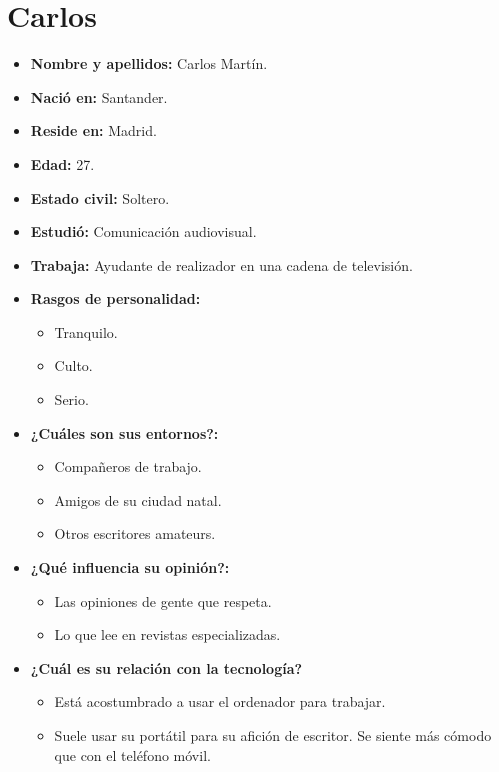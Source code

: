 \section{Carlos}
\begin{itemize}
    \item \textbf{Nombre y apellidos: } Carlos Martín.
    \item \textbf{Nació en: } Santander.
    \item \textbf{Reside en: } Madrid.
    \item \textbf{Edad: } 27.
    \item \textbf{Estado civil: } Soltero.
    \item \textbf{Estudió: } Comunicación audiovisual.
    \item \textbf{Trabaja: } Ayudante de realizador en una cadena de televisión.
    \item \textbf{Rasgos de personalidad: } 
    \begin{itemize}
      \item Tranquilo.
      \item Culto.
      \item Serio.
    \end{itemize}
    \item \textbf{¿Cuáles son sus entornos?: } 
    \begin{itemize}
      \item Compañeros de trabajo.
      \item Amigos de su ciudad natal.
      \item Otros escritores amateurs.
    \end{itemize}
    \item \textbf{¿Qué influencia su opinión?: } 
    \begin{itemize}
      \item Las opiniones de gente que respeta.
      \item Lo que lee en revistas especializadas.
    \end{itemize}
    \item \textbf{¿Cuál es su relación con la tecnología?} 
  \begin{itemize}
    \item Está acostumbrado a usar el ordenador para trabajar.
    \item Suele usar su portátil para su afición de escritor. Se siente más cómodo que con el teléfono móvil.
  \end{itemize}
  \end{itemize}